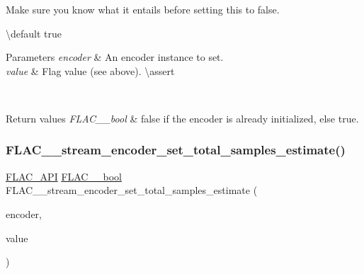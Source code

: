 Make sure you know what it entails before setting this to {\ttfamily false}.

\textbackslash{}default {\ttfamily true} 
\begin{DoxyParams}{Parameters}
{\em encoder} & An encoder instance to set. \\
\hline
{\em value} & Flag value (see above). \textbackslash{}assert 
\begin{DoxyCode}{1}
\end{DoxyCode}
 \\
\hline
\end{DoxyParams}

\begin{DoxyRetVals}{Return values}
{\em F\+L\+A\+C\+\_\+\+\_\+bool} & {\ttfamily false} if the encoder is already initialized, else {\ttfamily true}. \\
\hline
\end{DoxyRetVals}
\mbox{\label{group__flac__stream__encoder_ga0d3f45052f2f7379c73e2b027c7f956c}} 
\subsubsection{\texorpdfstring{FLAC\_\_stream\_encoder\_set\_total\_samples\_estimate()}{FLAC\_\_stream\_encoder\_set\_total\_samples\_estimate()}}
{\footnotesize\ttfamily \mbox{\hyperlink{group__flac__export_ga56ca07df8a23310707732b1c0007d6f5}{F\+L\+A\+C\+\_\+\+A\+PI}} \mbox{\hyperlink{ordinals_8h_a95103469f1cbd78b8cf250194985b34e}{F\+L\+A\+C\+\_\+\+\_\+bool}} F\+L\+A\+C\+\_\+\+\_\+stream\+\_\+encoder\+\_\+set\+\_\+total\+\_\+samples\+\_\+estimate (\begin{DoxyParamCaption}\item[{\mbox{\hyperlink{struct_f_l_a_c_____stream_encoder}{F\+L\+A\+C\+\_\+\+\_\+\+Stream\+Encoder}} $\ast$}]{encoder,  }\item[{\mbox{\hyperlink{ordinals_8h_aa78c8c70a3eb8a58af7436f278acde8e}{F\+L\+A\+C\+\_\+\+\_\+uint64}}}]{value }\end{DoxyParamCaption})}

